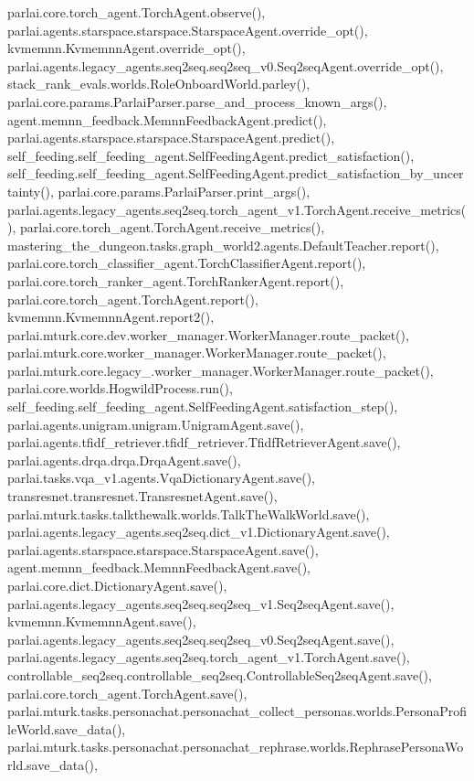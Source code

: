 parlai.\+core.\+torch\+\_\+agent.\+Torch\+Agent.\+observe(), parlai.\+agents.\+starspace.\+starspace.\+Starspace\+Agent.\+override\+\_\+opt(), kvmemnn.\+Kvmemnn\+Agent.\+override\+\_\+opt(), parlai.\+agents.\+legacy\+\_\+agents.\+seq2seq.\+seq2seq\+\_\+v0.\+Seq2seq\+Agent.\+override\+\_\+opt(), stack\+\_\+rank\+\_\+evals.\+worlds.\+Role\+Onboard\+World.\+parley(), parlai.\+core.\+params.\+Parlai\+Parser.\+parse\+\_\+and\+\_\+process\+\_\+known\+\_\+args(), agent.\+memnn\+\_\+feedback.\+Memnn\+Feedback\+Agent.\+predict(), parlai.\+agents.\+starspace.\+starspace.\+Starspace\+Agent.\+predict(), self\+\_\+feeding.\+self\+\_\+feeding\+\_\+agent.\+Self\+Feeding\+Agent.\+predict\+\_\+satisfaction(), self\+\_\+feeding.\+self\+\_\+feeding\+\_\+agent.\+Self\+Feeding\+Agent.\+predict\+\_\+satisfaction\+\_\+by\+\_\+uncertainty(), parlai.\+core.\+params.\+Parlai\+Parser.\+print\+\_\+args(), parlai.\+agents.\+legacy\+\_\+agents.\+seq2seq.\+torch\+\_\+agent\+\_\+v1.\+Torch\+Agent.\+receive\+\_\+metrics(), parlai.\+core.\+torch\+\_\+agent.\+Torch\+Agent.\+receive\+\_\+metrics(), mastering\+\_\+the\+\_\+dungeon.\+tasks.\+graph\+\_\+world2.\+agents.\+Default\+Teacher.\+report(), parlai.\+core.\+torch\+\_\+classifier\+\_\+agent.\+Torch\+Classifier\+Agent.\+report(), parlai.\+core.\+torch\+\_\+ranker\+\_\+agent.\+Torch\+Ranker\+Agent.\+report(), parlai.\+core.\+torch\+\_\+agent.\+Torch\+Agent.\+report(), kvmemnn.\+Kvmemnn\+Agent.\+report2(), parlai.\+mturk.\+core.\+dev.\+worker\+\_\+manager.\+Worker\+Manager.\+route\+\_\+packet(), parlai.\+mturk.\+core.\+worker\+\_\+manager.\+Worker\+Manager.\+route\+\_\+packet(), parlai.\+mturk.\+core.\+legacy\+\_.\+worker\+\_\+manager.\+Worker\+Manager.\+route\+\_\+packet(), parlai.\+core.\+worlds.\+Hogwild\+Process.\+run(), self\+\_\+feeding.\+self\+\_\+feeding\+\_\+agent.\+Self\+Feeding\+Agent.\+satisfaction\+\_\+step(), parlai.\+agents.\+unigram.\+unigram.\+Unigram\+Agent.\+save(), parlai.\+agents.\+tfidf\+\_\+retriever.\+tfidf\+\_\+retriever.\+Tfidf\+Retriever\+Agent.\+save(), parlai.\+agents.\+drqa.\+drqa.\+Drqa\+Agent.\+save(), parlai.\+tasks.\+vqa\+\_\+v1.\+agents.\+Vqa\+Dictionary\+Agent.\+save(), transresnet.\+transresnet.\+Transresnet\+Agent.\+save(), parlai.\+mturk.\+tasks.\+talkthewalk.\+worlds.\+Talk\+The\+Walk\+World.\+save(), parlai.\+agents.\+legacy\+\_\+agents.\+seq2seq.\+dict\+\_\+v1.\+Dictionary\+Agent.\+save(), parlai.\+agents.\+starspace.\+starspace.\+Starspace\+Agent.\+save(), agent.\+memnn\+\_\+feedback.\+Memnn\+Feedback\+Agent.\+save(), parlai.\+core.\+dict.\+Dictionary\+Agent.\+save(), parlai.\+agents.\+legacy\+\_\+agents.\+seq2seq.\+seq2seq\+\_\+v1.\+Seq2seq\+Agent.\+save(), kvmemnn.\+Kvmemnn\+Agent.\+save(), parlai.\+agents.\+legacy\+\_\+agents.\+seq2seq.\+seq2seq\+\_\+v0.\+Seq2seq\+Agent.\+save(), parlai.\+agents.\+legacy\+\_\+agents.\+seq2seq.\+torch\+\_\+agent\+\_\+v1.\+Torch\+Agent.\+save(), controllable\+\_\+seq2seq.\+controllable\+\_\+seq2seq.\+Controllable\+Seq2seq\+Agent.\+save(), parlai.\+core.\+torch\+\_\+agent.\+Torch\+Agent.\+save(), parlai.\+mturk.\+tasks.\+personachat.\+personachat\+\_\+collect\+\_\+personas.\+worlds.\+Persona\+Profile\+World.\+save\+\_\+data(), parlai.\+mturk.\+tasks.\+personachat.\+personachat\+\_\+rephrase.\+worlds.\+Rephrase\+Persona\+World.\+save\+\_\+data(), 